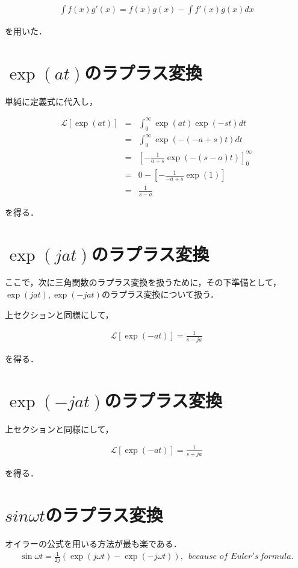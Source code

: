 \documentclass[a4paper, 12pt]{jsarticle}
\begin{document}
\begin{eqnarray}
\int f(x)g'(x) = f(x)g(x) - \int f'(x)g(x) dx
\end{eqnarray}

を用いた．

\section{$\exp(at)$のラプラス変換}
単純に定義式に代入し，

\begin{eqnarray}
    \mathcal{L}[\exp(at)] &=& \int_0^\infty \exp(at)\exp(-st)dt \\ \nonumber
&=& \int_0^\infty \exp(-(-a + s)t) dt \\ \nonumber
&=& \left[-\frac{1}{a+s} \exp(-(s-a)t)\right]_0^\infty \\ \nonumber
&=& 0 - \left[-\frac{1}{-a + s} \exp(1)\right] \\ \nonumber
&=& \frac{1}{s - a}
\end{eqnarray}

を得る．

\section{$\exp(jat)$のラプラス変換}
ここで，次に三角関数のラプラス変換を扱うために，その下準備として，$\exp(jat),\exp(-jat)$のラプラス変換について扱う．
\par
上セクションと同様にして，

\begin{eqnarray}
    \mathcal{L}[\exp(-at)] = \frac{1}{s - ja}
\end{eqnarray}

を得る．

\section{$\exp(-jat)$のラプラス変換}
上セクションと同様にして，

\begin{eqnarray}
    \mathcal{L}[\exp(-at)] = \frac{1}{s + ja}
\end{eqnarray}

を得る．

\section{$sin \omega t$のラプラス変換}
オイラーの公式を用いる方法が最も楽である．
\begin{eqnarray}
    \sin \omega t = \frac{1}{2j}(\exp(j \omega t) - \exp(-j \omega t)), \,\,\, because \,\, of \,\, Euler's \, formula.
\end{eqnarray}
\end{document}
